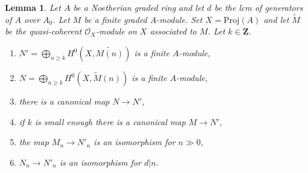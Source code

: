 \documentclass[10pt,a4paper]{amsart}
\theoremstyle{plain}
\newtheorem{lemma}[subsection]{Lemma}
\theoremstyle{definition}
\theoremstyle{remark}
\numberwithin{equation}{subsection}
\begin{document}
\begin{lemma}
\label{lemma-recover-tail-graded-module-general}
Let $A$ be a Noetherian graded ring and let $d$ be the lcm of generators
of $A$ over $A_0$. Let $M$ be a finite graded $A$-module.
Set $X = \text{Proj}(A)$ and let $\widetilde{M}$ be
the quasi-coherent $\mathcal{O}_X$-module on $X$ associated to $M$.
Let $k \in \mathbf{Z}$.
\begin{enumerate}
\item $N' = \bigoplus_{n \geq k} H^0(X, \widetilde{M(n)})$
is a finite $A$-module,
\item $N = \bigoplus_{n \geq k} H^0(X, \widetilde{M}(n))$
is a finite $A$-module,
\item there is a canonical map $N \to N'$,
\item if $k$ is small enough there is a canonical map $M \to N'$,
\item the map $M_n \to N'_n$ is an isomorphism for $n \gg 0$,
\item $N_n \to N'_n$ is an isomorphism for $d | n$.
\end{enumerate}
\end{lemma}
\end{document}
